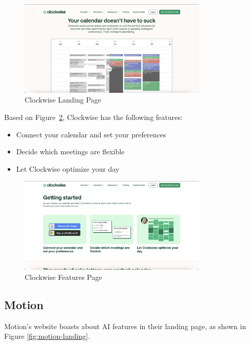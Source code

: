 \documentclass[12pt,a4paper]{report}
\begin{document}
\begin{figure}[!h]
    \centering
    \includegraphics[width=0.8\textwidth]{images/competitors/clockwise-landing.png}
    \caption{Clockwise Landing Page}
    \label{fig:clockwise-landing}
\end{figure}

Based on Figure~\ref{fig:clockwise-features}, Clockwise has the following features:
\begin{itemize}
    \item Connect your calendar and set your preferences
    \item Decide which meetings are flexible
    \item Let Clockwise optimize your day
\end{itemize}

\begin{figure}[!h]
    \centering
    \includegraphics[width=0.8\textwidth]{images/competitors/clockwise-features.png}
    \caption{Clockwise Features Page}
    \label{fig:clockwise-features}
\end{figure}

\subsection{Motion}

Motion's website boasts about AI features in their landing page, as shown in Figure \ref{fig:motion-landing}.
\end{document}
